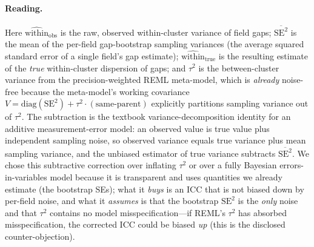 \documentclass[11pt]{article}
\begin{document}
\paragraph{Reading.} Here $\widehat{\text{within}}_{\text{obs}}$ is the raw, observed within-cluster variance of field gaps; $\overline{\mathrm{SE}^2}$ is the mean of the per-field gap-bootstrap sampling variances (the average squared standard error of a single field's gap estimate); $\widehat{\text{within}}_{\text{true}}$ is the resulting estimate of the \emph{true} within-cluster dispersion of gaps; and $\tau^2$ is the between-cluster variance from the precision-weighted REML meta-model, which is \emph{already} noise-free because the meta-model's working covariance $V=\mathrm{diag}(\mathrm{SE}^2)+\tau^2\cdot(\text{same-parent})$ explicitly partitions sampling variance out of $\tau^2$. The subtraction is the textbook variance-decomposition identity for an additive measurement-error model: an observed value is true value plus independent sampling noise, so observed variance equals true variance plus mean sampling variance, and the unbiased estimator of true variance subtracts $\overline{\mathrm{SE}^2}$. We chose this subtractive correction over inflating $\tau^2$ or over a fully Bayesian errors-in-variables model because it is transparent and uses quantities we already estimate (the bootstrap SEs); what it \emph{buys} is an ICC that is not biased down by per-field noise, and what it \emph{assumes} is that the bootstrap $\mathrm{SE}^2$ is the \emph{only} noise and that $\tau^2$ contains no model misspecification---if REML's $\tau^2$ has absorbed misspecification, the corrected ICC could be biased \emph{up} (this is the disclosed counter-objection).
\end{document}
